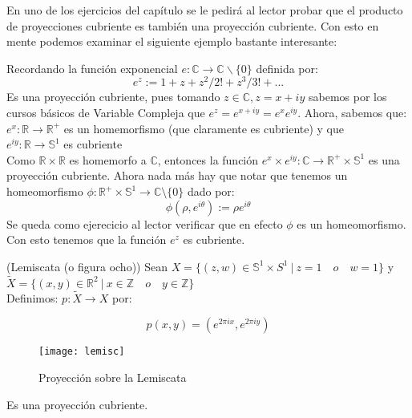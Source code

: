 En uno de los ejercicios del cap\'itulo se le pedir\'a al lector probar que el producto de proyecciones cubriente es tambi\'en una proyecci\'on cubriente. Con esto en mente podemos examinar el siguiente ejemplo bastante interesante:

\begin{example}
Recordando la funci\'on exponencial $e:\mathbb{C} \rightarrow \mathbb{C} \backslash \lbrace 0 \rbrace$ definida por:
$$ e^z:=1+z+z^2/2!+z^3/3!+...$$
Es una proyecci\'on cubriente, pues tomando $z \in \mathbb{C}, z=x+iy$ sabemos por los cursos b\'asicos de Variable Compleja que $e^z=e^{x+iy}=e^x e^{iy}$. Ahora, sabemos que:\\

$e^x: \mathbb R \rightarrow \mathbb{R^{+}} $ es un homemorfismo (que claramente es cubriente) y que\\

$e^{iy}: \mathbb R \rightarrow \mathbb S^1 $ es cubriente\\
Como $\mathbb R \times \mathbb R$ es homemorfo a $\mathbb{C}$, entonces la funci\'on $e^x \times e^{iy} :\mathbb{C} \rightarrow \mathbb{R^{+}} \times \mathbb S^{1}$ es una proyecci\'on cubriente. Ahora nada m\'as hay que notar que tenemos un homeomorfismo $\phi :\mathbb{R^{+}} \times \mathbb S^1 \rightarrow \mathbb{C}\setminus \lbrace 0 \rbrace$ dado por: 
$$\phi(\rho,e^{i \theta}):= \rho e^{i \theta}$$
Se queda como ejerecicio al lector verificar que en efecto $\phi$ es un homeomorfismo. Con esto tenemos que la funci\'on $e^z$ es cubriente.\\
\end{example}

\begin{example}(Lemiscata (o figura ocho))
Sean $X=\lbrace (z,w) \in \mathbb S^1\times S^1 \: | \: z=1 \quad o \quad w=1 \rbrace$ y $\widetilde{X}=\lbrace(x,y)\in \mathbb R^2 \: | \: x \in \mathbb{Z} \quad o \quad y \in \mathbb{Z} \rbrace$\\

Definimos: $p:\widetilde{X} \rightarrow X$ por:

$$p(x,y)=(e^{2\pi i x},e^{2\pi i y})$$


\begin{figure}[h]
\begin{center}
      \texttt{[image: lemisc]}
\end{center}
\caption{Proyecci\'on sobre la Lemiscata}
\end{figure} 


Es una proyecci\'on cubriente.
\end{example}

